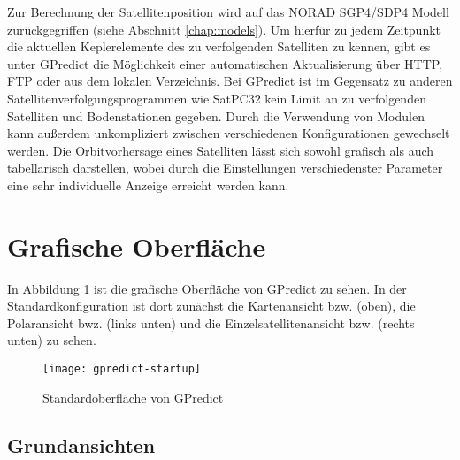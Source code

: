 \clearpage

Zur Berechnung der Satellitenposition wird auf das NORAD SGP4/SDP4 Modell zurückgegriffen (siehe Abschnitt \ref{chap:models}). Um hierfür zu jedem Zeitpunkt die aktuellen Keplerelemente des zu verfolgenden Satelliten zu kennen, gibt es unter GPredict die Möglichkeit einer automatischen Aktualisierung über HTTP, FTP oder aus dem lokalen Verzeichnis.\newpar
Bei GPredict ist im Gegensatz zu anderen Satellitenverfolgungsprogrammen wie SatPC32 kein Limit an zu verfolgenden Satelliten und Bodenstationen gegeben. Durch die Verwendung von Modulen kann außerdem unkompliziert zwischen verschiedenen Konfigurationen gewechselt werden. Die Orbitvorhersage eines Satelliten lässt sich sowohl grafisch als auch tabellarisch darstellen, wobei durch die Einstellungen verschiedenster Parameter eine sehr individuelle Anzeige erreicht werden kann.

\section{Grafische Oberfläche}

In Abbildung \ref{fig:gpredictstartup} ist die grafische Oberfläche von GPredict zu sehen. In der Standardkonfiguration ist dort zunächst die Kartenansicht bzw.  (oben), die Polaransicht bwz.  (links unten) und die Einzelsatellitenansicht bzw.  (rechts unten) zu sehen.

\begin{figure}[h]
	\centering
	\texttt{[image: gpredict-startup]}
	\caption{Standardoberfläche von GPredict}
	\label{fig:gpredictstartup} 
\end{figure}

\clearpage

\subsection{Grundansichten}

